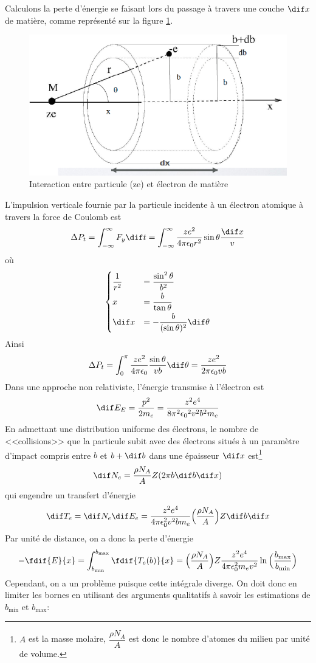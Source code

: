 Calculons la perte d'énergie se faisant lors du passage à travers une couche $\dif x$ de matière, comme représenté sur la figure \ref{fig:interraction_particule_matiere}.
\begin{figure}[ht]
    \centering
    \includegraphics[scale=0.60]{Images1/pertenrj.PNG}
    \caption{Interaction entre particule (ze) et électron de matière}
    \label{fig:interraction_particule_matiere}
\end{figure}
L'impulsion verticale fournie par la particule incidente à un électron atomique à travers la force de Coulomb est
\[
    \Delta P_t=\int_{-\infty}^\infty F_y \dt=\int_{-\infty}^\infty \dfrac{ze^2}{4\pi \epsilon_0 r^2} \sin{\theta}\dfrac{\dif x}{v}
\]
où
\[\begin{cases}
    \dfrac{1}{r^2} &= \dfrac{\sin^2\theta}{b^2} \\[2mm]
    x &= \dfrac{b}{\tan{\theta}} \\[2mm]
    \dif x &= -\dfrac{b}{(\sin{\theta})^2}\dif\theta
\end{cases}\]
Ainsi
\[
    \Delta P_t=\int_{0}^\pi \dfrac{ze^2}{4\pi \epsilon_0}\dfrac{\sin{\theta}}{vb}\dif\theta = \dfrac{ze^2}{2\pi \epsilon_0 vb}
\]
Dans une approche non relativiste, l'énergie transmise à l'électron est
\[
    \dif E_E=\dfrac{p^2}{2m_e}=\dfrac{z^2e^4}{8\pi^2{\epsilon_0}^2v^2b^2m_e}
\]
En admettant une distribution uniforme des électrons, le nombre de <<collisions>> que la particule subit avec des électrons situés à un paramètre d'impact compris entre $b$ et $b+\dif b$ dans une épaisseur $\dif x$ est\footnote{$A$ est la masse molaire, $\dfrac{\rho N_A}{A}$ est donc le nombre d'atomes du milieu par unité de volume.}
\[
    \dif N_e=\dfrac{\rho N_A}{A}Z(2\pi b \dif b \dif x)
\]
qui engendre un transfert d'énergie
\[
    \dif T_e=\dif N_e\dif E_e=\dfrac{z^2e^4}{4\pi \epsilon_0^2v^2bm_e}\Big(\dfrac{\rho N_A}{A}\Big)Z \dif b \dif x
\]
Par unité de distance, on a donc la perte d'énergie
\[
    -\fdif{E}{x}=\int_{b_\text{min}}^{b_\text{max}} \fdif{T_e(b)}{x}=\Big(\dfrac{\rho N_A}{A}\Big)Z\dfrac{z^2e^4}{4\pi \epsilon_0^2m_ev^2}\ln{\Big(\dfrac{b_\text{max}}{b_\text{min}}\Big)}
\]
Cependant, on a un problème puisque cette intégrale diverge. On doit donc en limiter les bornes en utilisant des arguments qualitatifs à savoir les estimations de $b_\text{min}$ et $b_\text{max}$:

